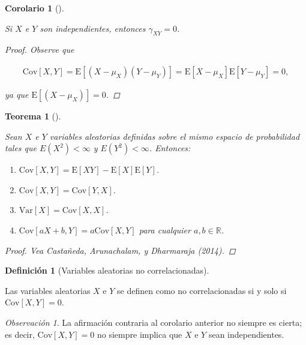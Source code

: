 \documentclass[
  us-letterpaper,
]{scrreprt}
\theoremstyle{plain}
\newtheorem{theorem}{Teorema}[chapter]
\theoremstyle{definition}
\newtheorem{definition}{Definición}[chapter]
\theoremstyle{definition}
\theoremstyle{plain}
\newtheorem{corollary}{Corolario}[chapter]
\theoremstyle{remark}
\newtheorem*{remark}{Observación}
\begin{document}
\begin{corollary}[]\protect\hypertarget{cor-covind}{}\label{cor-covind}

Si \(X\) e \(Y\) son independientes, entonces \(\gamma_{XY}=0\).

\begin{proof}
Observe que

\[ \begin{split}\mathrm{Cov}[X,Y]=\mathrm E[(X-\mu_X)(Y-\mu_Y)]=\mathrm E[X-\mu_X]\mathrm E[Y-\mu_Y]=0,\end{split} \]

ya que \(\mathrm E[(X-\mu_X)]=0\).
\end{proof}

\end{corollary}

\begin{theorem}[]\protect\hypertarget{thm-propiedades}{}\label{thm-propiedades}

Sean \(X\) e \(Y\) variables aleatorias definidas sobre el mismo espacio
de probabilidad tales que \(E(X^2) < \infty\) y \(E(Y^2) < \infty\).
Entonces:

\begin{enumerate}
\def\labelenumi{\roman{enumi}.}
\item
  \(\mathrm{Cov}[X, Y]= \mathrm{E}[XY]-\mathrm{E}[X]\mathrm{E}[Y]\).
\item
  \(\mathrm{Cov}[X, Y]= \mathrm{Cov}[Y,X]\).
\item
  \(\mathrm{Var}[X]= \mathrm{Cov}[X,X]\).
\item
  \(\mathrm{Cov}[aX+b, Y]= a\mathrm{Cov}[X, Y]\) para cualquier
  \(a,b \in\mathbb{R}\).
\end{enumerate}

\begin{proof}
Vea Castañeda, Arunachalam, y Dharmaraja (2014).
\end{proof}

\end{theorem}

\begin{definition}[Variables aleatorias no
correlacionadas]\protect\hypertarget{def-uncorr}{}\label{def-uncorr}

Las variables aleatorias \(X\) e \(Y\) se definen como no
correlacionadas si y solo si \(\mathrm{Cov}[X,Y]=0\).

\end{definition}

\begin{remark}
La afirmación contraria al corolario anterior no siempre es cierta; es
decir, \(\mathrm{Cov}[X,Y]=0\) no siempre implica que \(X\) e \(Y\) sean
independientes.
\end{remark}
\end{document}
